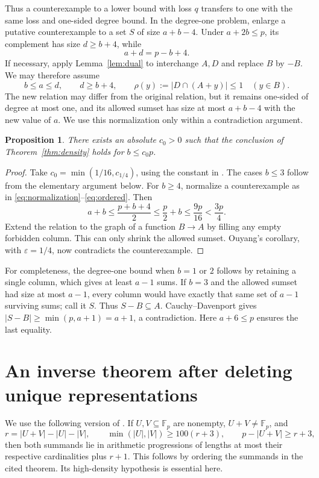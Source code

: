 \documentclass[11pt]{article}
\newtheorem{proposition}[theorem]{Proposition}
\theoremstyle{remark}
\newcommand{\F}{\mathbb F}
\begin{document}
Thus a counterexample to a lower bound with loss $q$ transfers to one with the same loss and one-sided degree bound. In the degree-one problem, enlarge a putative counterexample to a set $S$ of size $a+b-4$. Under $a+2b\le p$, its complement has size $d\ge b+4$, while
\begin{equation}\label{eq:normalization}
 a+d=p-b+4.
\end{equation}
If necessary, apply Lemma~\ref{lem:dual} to interchange $A,D$ and replace $B$ by $-B$. We may therefore assume
\begin{equation}\label{eq:ordered}
 b\le a\le d,\qquad d\ge b+4,\qquad
 \rho(y):=|D\cap(A+y)|\le1\quad(y\in B).
\end{equation}
The new relation may differ from the original relation, but it remains one-sided of degree at most one, and its allowed sumset has size at most $a+b-4$ with the new value of $a$. We use this normalization only within a contradiction argument.

\begin{proposition}\label{prop:qualitative}
There exists an absolute $c_0>0$ such that the conclusion of Theorem~\ref{thm:density} holds for $b\le c_0p$.
\end{proposition}
\begin{proof}
Take $c_0=\min(1/16,c_{1/4})$, using the constant in \cite[Corollary~1.8(i)]{Ouyang}. The cases $b\le3$ follow from the elementary argument below. For $b\ge4$, normalize a counterexample as in \eqref{eq:normalization}--\eqref{eq:ordered}. Then
\[
 a+b\le\frac{p+b+4}{2}\le\frac p2+b\le\frac{9p}{16}<\frac{3p}{4}.
\]
Extend the relation to the graph of a function $B\to A$ by filling any empty forbidden column. This can only shrink the allowed sumset. Ouyang's corollary, with $\varepsilon=1/4$, now contradicts the counterexample.
\end{proof}

For completeness, the degree-one bound when $b=1$ or $2$ follows by retaining a single column, which gives at least $a-1$ sums. If $b=3$ and the allowed sumset had size at most $a-1$, every column would have exactly that same set of $a-1$ surviving sums; call it $S$. Thus $S-B\subseteq A$. Cauchy--Davenport gives $|S-B|\ge\min(p,a+1)=a+1$, a contradiction. Here $a+6\le p$ ensures the last equality.

\section{An inverse theorem after deleting unique representations}
We use the following version of \cite[Theorem~1.4]{Grynkiewicz}. If $U,V\subseteq\F_p$ are nonempty, $U+V\ne\F_p$, and
\[
 r=|U+V|-|U|-|V|,\qquad
 \min(|U|,|V|)\ge100(r+3),\qquad
 p-|U+V|\ge r+3,
\]
then both summands lie in arithmetic progressions of lengths at most their respective cardinalities plus $r+1$. This follows by ordering the summands in the cited theorem. Its high-density hypothesis is essential here.
\end{document}
